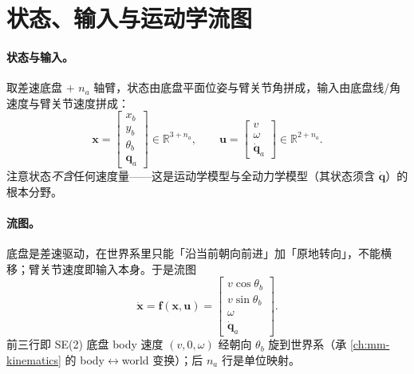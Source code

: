 \section{状态、输入与运动学流图}
\label{sec:mmocp-model}

\paragraph{状态与输入。}
取差速底盘 $+$ $n_a$ 轴臂，状态由底盘平面位姿与臂关节角拼成，输入由底盘线/角速度与臂关节速度拼成：
\begin{equation}
  \mathbf x=\begin{bmatrix}x_b\\ y_b\\ \theta_b\\ \mathbf q_a\end{bmatrix}\in\mathbb R^{3+n_a},
  \qquad
  \mathbf u=\begin{bmatrix}v\\ \omega\\ \dot{\mathbf q}_a\end{bmatrix}\in\mathbb R^{2+n_a}.
  \label{eq:mmocp-xu}
\end{equation}
注意状态\emph{不含}任何速度量——这是运动学模型与全动力学模型（其状态须含 $\dot{\mathbf q}$）的根本分野。

\paragraph{流图。}
底盘是差速驱动，在世界系里只能「沿当前朝向前进」加「原地转向」，不能横移；臂关节速度即输入本身。于是流图
\begin{equation}
  \dot{\mathbf x}=\mathbf f(\mathbf x,\mathbf u)=
  \begin{bmatrix}v\cos\theta_b\\ v\sin\theta_b\\ \omega\\ \dot{\mathbf q}_a\end{bmatrix}.
  \label{eq:mmocp-flow}
\end{equation}
前三行即 SE(2) 底盘 body 速度 $(v,0,\omega)$ 经朝向 $\theta_b$ 旋到世界系（承 \cref{ch:mm-kinematics} 的 body$\leftrightarrow$world 变换）；后 $n_a$ 行是单位映射。

